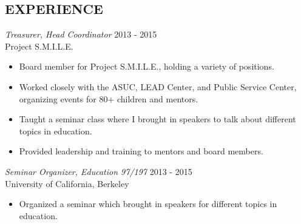 \documentclass[resmargin, 6pt]{res} %
\begin{document}
\begin{resume}
\section{EXPERIENCE}
{\sl Treasurer, Head Coordinator} \hfill            2013 - 2015\\
                Project S.M.I.L.E.
                 \begin{itemize}  \itemsep -2pt %
                 \item Board member for Project S.M.I.L.E., holding a variety of positions.
                \item Worked closely with the ASUC, LEAD Center, and Public Service Center, organizing events for 80+ children and mentors.
		\item Taught a seminar class where I brought in speakers to talk about different topics in education.
		\item Provided leadership and training to mentors and board members.
                 \end{itemize}
{\sl Seminar Organizer, Education 97/197} \hfill                       2013 - 2015\\
                University of California, Berkeley
                \begin{itemize} \itemsep -2pt
                \item Organized a seminar which brought in speakers for different topics in education.
                \end{itemize}





\end{resume}
\end{document}
